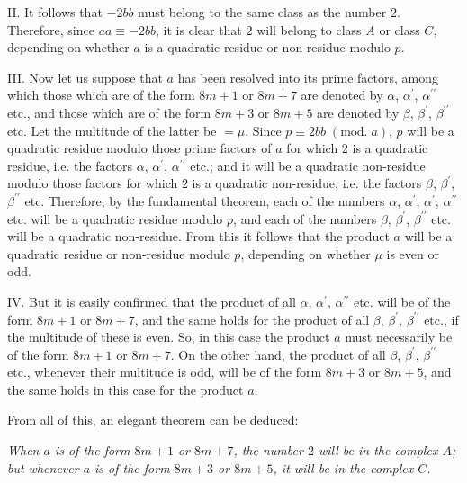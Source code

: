 \documentclass[twoside,12pt]{memoir}
\renewcommand{\pmod}[1]{\;(\textrm{mod.}\;#1)}
\begin{document}
II. It follows that \(-2 b b\) must belong to the same class as the number \(2\).  Therefore, since \(a a \equiv-2 b b\), it is clear that \(2\) will belong to class \(A\) or class \(C\), depending on whether \(a\) is a quadratic residue or non-residue modulo \(p\).

III. Now let us suppose that \(a\) has been resolved into its prime factors, among which those which are of the form \(8 m+1\) or \(8 m+7\) are denoted by \(\alpha\), \(\alpha^{\prime}\), \(\alpha^{\prime \prime}\) etc{.}, and those which are of the form \(8 m+3\) or \(8 m+5\) are denoted by \(\beta\), \(\beta^{\prime}\), \(\beta^{\prime \prime}\) etc.  Let the multitude of the latter be \(=\mu\). Since \(p \equiv 2 b b \pmod{a}\), \(p\) will be a quadratic residue modulo those prime factors of \(a\) for which 2 is a quadratic residue, i{.}e{.} the factors \(\alpha\), \(\alpha^{\prime}\), \(\alpha^{\prime \prime}\) etc{.}; and it will be a quadratic non-residue modulo those factors for which \(2\) is a quadratic non-residue, i{.}e{.} the factors \(\beta\), \(\beta^{\prime}\), \(\beta^{\prime \prime}\) etc{.}  Therefore, by the fundamental theorem, each of the numbers \(\alpha\), \(\alpha^{\prime}\), \(\alpha^{\prime}\), \(\alpha^{\prime \prime}\) etc{.} will be a quadratic residue modulo \(p\), and each of the numbers \(\beta\), \(\beta^{\prime}\), \(\beta^{\prime \prime}\) etc{.} will be a quadratic non-residue. From this it follows that the product \(a\) will be a quadratic residue or non-residue modulo \(p\), depending on whether \(\mu\) is even or odd.

IV. But it is easily confirmed that the product of all \(\alpha\), \(\alpha^{\prime}\), \(\alpha^{\prime \prime}\) etc{.} will be of the form \(8 m+1\) or \(8 m+7\), and the same holds for the product of all \(\beta\), \(\beta^{\prime}\), \(\beta^{\prime \prime}\) etc{.}, if the multitude of these is even.  So, in this case the product \(a\) must necessarily be of the form \(8 m+1\) or \(8 m+7\).  On the other hand, the product of all \(\beta\), \(\beta^{\prime}\), \(\beta^{\prime \prime}\) etc{.}, whenever \pagebreak%
their multitude is odd, will be of the form \(8 m+3\) or \(8 m+5\), and the same holds in this case for the product \(a\).

From all of this, an elegant theorem can be deduced:

\textit{When \(a\) is of the form \(8m+1\) or \(8m+7\), the number \(2\) will be in the complex \(A\); but whenever 
\(a\) is of the form \(8m+3\) or \(8m+5\), it will be in the complex \(C\).}
\end{document}

